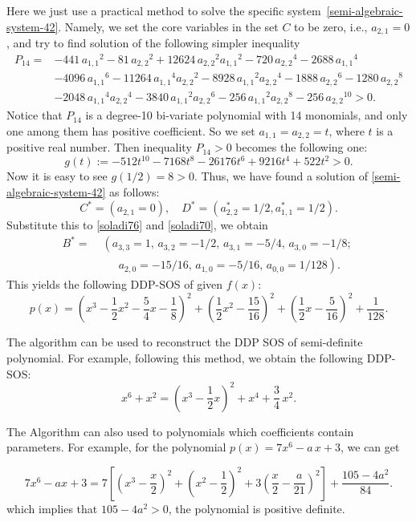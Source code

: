 \documentclass[runningheads]{llncs}
\begin{document}
Here we just use a practical method to solve the specific system~\eqref{semi-algebraic-system-42}. Namely, we set the core variables in the set $C$ to be zero, i.e., $a_{2,1}=0$,  and try to find solution of the following simpler inequality
\begin{align*}
P_{14}=&
-441\,{a_{1,1}}^{2}-81\,{a_{2,2}}^{2}
+12624\,{a_{2,2}}^{2}{a_{1,1}}^{2}-720\,{a_{2,2}}^{4}-2688\,{a_{1,1}}^{4}\\
&-4096\,{a_{1,1}}^{6}-11264\,{a_{1,1}}^{4}{a_{2,2}}^{2}-8928\,{a_{1,1}}^{2}{a_{2,2}}^{4}-1888\,{a_{2,2}}^{6}-1280\,{a_{2,2}}^{8}\\
&-2048\,{a_{1,1}}^{4}{a_{2,2}}^{4}-3840\,{a_{1,1}}^{2}{a_{2,2}}^{6}
-256\,{a_{1,1}}^{2}{a_{2,2}}^{8}-256\,{a_{2,2}}^{10}
>0.
\end{align*}
Notice that $P_{14}$  is a degree-10 bi-variate polynomial with 14 monomials, and only one among them has positive coefficient. So we set  $a_{1,1}=a_{2,2}=t$, where $t$ is a positive real number. Then inequality
$P_{14}>0$ becomes the following one:
$$
g(t):=-512t^{10}-7168t^8-26176t^6+9216t^4+522t^2>0.
$$
Now it is easy to see $g(1/2)=8>0$. 
Thus, we have found a solution of 
\eqref{semi-algebraic-system-42} as follows:
$$
C^*=\left(a_{2,1}=0\right), \quad 
D^*=\left(a_{2,2}^*={1}/{2}, a_{1,1}^*={1}/{2}\right).
$$
Substitute this to \eqref{soladi76} and \eqref{soladi70}, we obtain
\begin{align*}
B^*=&\; \left(a_{3,3}=1, \, a_{3,2}=-{1}/{2}, \, a_{3,1}=-{5}/{4}, \, a_{3,0}=-{1}/{8}; \; \right.\\
&\phantom{xxx}\left. a_{2,0}=-{15}/{16}, \, a_{1,0}=-{5}/{16}, \, a_{0,0}={1}/{128}
\right).
\end{align*}
This yields the following DDP-SOS of given $f(x)$: 
$$
p(x)=\left(x^3-\frac{1}{2}x^2-\frac{5}{4}x-\frac{1}{8}\right)^2+
\left(\frac{1}{2}x^2-\frac{15}{16}\right)^2+
\left(\frac{1}{2}x-\frac{5}{16}\right)^2+
\frac{1}{128}.
$$

The algorithm can be used to reconstruct the DDP SOS of semi-definite polynomial. For example, following this method, we obtain the following DDP-SOS: 
\[
x^6+x^2 = \left( x^3- \frac{1}{2}x \right)^2+x^4+\frac{3}{4}\,x^2.
\]

The Algorithm can also used to polynomials which coefficients contain parameters. For example, for the polynomial 
$p(x)=7x^6-a\,x+3$, we can get

$$
7x^6\!-\!ax\!+\!3=7\left[\left( {x}^{3}\!-\!\frac{x}{2} \right) ^{2}\!+\! \left( {x}^{2}\!-\!{\frac{1}{2}}
 \right) ^{2}\!+\! 3\left( \frac{x}{2}\!-\!\frac{a}{21} \right) ^{2}\right]\!+\!\frac{105-4a^2}{84}.
$$
which implies that $105-4a^2>0$, the polynomial is positive definite.
\end{document}
